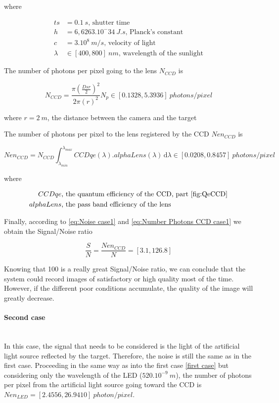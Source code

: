 where

\begin{align*}
ts & = 0.1\ s \mbox{, shutter time}  \\
h & = 6,6263.10^-34 \ J.s \mbox{, Planck's constant}  \\
c & = 3.10^8 \ m/s \mbox{, velocity of light} \\
\lambda & \in [400, 800] \ nm \mbox{, wavelength of the sunlight}
\end{align*}

The number of photons per pixel going to the lens $N_{CCD}$ is

\begin{equation}
\label{eq:Number Photons case1}
N_{CCD}=\frac{\pi\left(\frac{Dsr}{2}\right)^2}{2\pi(r)^2}N_p \in [0.1328, 5.3936] \ photons/pixel
\end{equation}

where $r = 2\ m$, the distance between the camera and the target

The number of photons per pixel to the lens registered by the CCD $Nen_{CCD}$ is

\begin{equation}
\label{eq:Number Photons CCD case1}
Nen_{CCD}= N_{CCD}\int_{\lambda_{min}}^{\lambda_{max}}CCDqe(\lambda).alphaLens(\lambda) \, \mathrm d\lambda \in [0.0208, 0.8457] \ photons/pixel
\end{equation}

where

\begin{align*}
CCDqe & \mbox{, the quantum efficiency of the CCD, part \ref{fig:QeCCD}}\\
alphaLens & \mbox{, the pass band efficiency of the lens}
\end{align*}

Finally, according to \eqref{eq:Noise case1} and \eqref{eq:Number Photons CCD case1} we obtain the Signal/Noise ratio 

\begin{equation}
\label{eq:Signal Noise Ratio case1}
\frac{S}{N} = \frac{Nen_{CCD}}{N} = [3.1, 126.8]
\end{equation}

Knowing that 100 is a really great Signal/Noise ratio, we can conclude that the system could record images of satisfactory or high quality most of the time. However, if the different poor conditions accumulate, the quality of the image will greatly decrease.

\paragraph*{Second case}
~~\\
In this case, the signal that needs to be considered is the light of the artificial light source reflected by the target. Therefore, the noise is still the same as in the first case. Proceeding in the same way as into the first case \ref{first case} but considering only the wavelength of the LED ($520.10^{-9}\ m$), the number of photons per pixel from the artificial light source going toward the CCD is $Nen_{LED} = [2.4556, 26.9410]\ photon/pixel$.

